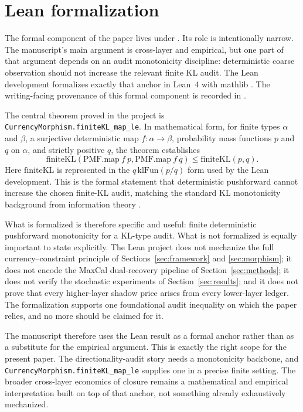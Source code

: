 \documentclass[11pt,a4paper]{article}
\begin{document}
 \section{Lean formalization}\label{app:lean}

The formal component of the paper lives under . Its role is intentionally narrow. The manuscript's main argument is cross-layer and empirical, but one part of that argument depends on an audit monotonicity discipline: deterministic coarse observation should not increase the relevant finite KL audit. The Lean development formalizes exactly that anchor in Lean~4 with mathlib \cite{demoura2015lean,mathlib2020}. The writing-facing provenance of this formal component is recorded in .

The central theorem proved in the project is \texttt{CurrencyMorphism.finiteKL\_map\_le}. In mathematical form, for finite types \(\alpha\) and \(\beta\), a surjective deterministic map \(f:\alpha\to\beta\), probability mass functions \(p\) and \(q\) on \(\alpha\), and strictly positive \(q\), the theorem establishes
\[
\mathrm{finiteKL}(\mathrm{PMF.map}\ f\ p,\mathrm{PMF.map}\ f\ q)\le \mathrm{finiteKL}(p,q).
\]
Here \(\mathrm{finiteKL}\) is represented in the \(q\,\mathrm{klFun}(p/q)\) form used by the Lean development. This is the formal statement that deterministic pushforward cannot increase the chosen finite-KL audit, matching the standard KL monotonicity background from information theory \cite{kullback1951information,coverthomas2006}.

What is formalized is therefore specific and useful: finite deterministic pushforward monotonicity for a KL-type audit. What is not formalized is equally important to state explicitly. The Lean project does not mechanize the full currency--constraint principle of Sections~\ref{sec:framework} and \ref{sec:morphism}; it does not encode the MaxCal dual-recovery pipeline of Section~\ref{sec:methods}; it does not verify the stochastic experiments of Section~\ref{sec:results}; and it does not prove that every higher-layer shadow price arises from every lower-layer ledger. The formalization supports one foundational audit inequality on which the paper relies, and no more should be claimed for it.

The manuscript therefore uses the Lean result as a formal anchor rather than as a substitute for the empirical argument. This is exactly the right scope for the present paper. The directionality-audit story needs a monotonicity backbone, and \texttt{CurrencyMorphism.finiteKL\_map\_le} supplies one in a precise finite setting. The broader cross-layer economics of closure remains a mathematical and empirical interpretation built on top of that anchor, not something already exhaustively mechanized.
\end{document}

